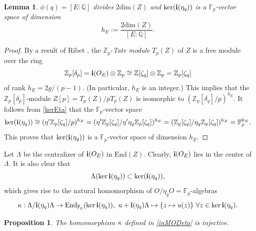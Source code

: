 \documentclass[12pt,a4paper,reqno]{amsart}
\def\Q{{\mathbb Q}}
\def\Z{{\mathbb Z}}
\def\F{{\mathbb F}}
\def\End{\mathrm{End}}
\def\dim{\mathrm{dim}}
\newtheorem{lem}[thm]{Lemma}
\newtheorem{prop}[thm]{Proposition}
\theoremstyle{definition}
\begin{document}
\begin{lem}
\label{RibetEta}
$\phi(q)=[E:\Q]$ divides $2\dim(Z)$ and $\ker({\bf i}(\eta_q))$ is a $\F_p$-vector space of dimension 
$$h_E:=\frac{2\dim(Z)}{[E:\Q]}.$$
\end{lem}

\begin{proof}
 By a result of Ribet \cite[Prop. 2.2.1 on p. 769]{Ribet2}, the
$\Z_p$-{\sl Tate module} $T_p(Z)$ of $Z$ is a free module over the ring
$$\Z_p[\delta_p]={\bf i}(O_E)\otimes \Z_p \cong \Z[\zeta_q]\otimes \Z_p =\Z_p[\zeta_q]$$
 of rank $h_E=2g/(p-1)$. (In particular, $h_E$ is an integer.) 
 This implies that the $\Z_p[\delta_p]$-module 
$Z[p]=T_p(Z)/p T_p(Z)$  is isomorphic to $(\Z_p[\delta_q]/p)^{h_E}$.  It follows from \eqref{kerEta} that the $\F_p$-vector space
$$\ker({\bf i}(\eta_q))\cong (\eta^{\prime}\Z_p[\zeta_q]/p)^{h_E}=(\eta^{\prime} \Z_p[\zeta_q]/ \eta^{\prime}\eta_q \Z_p[\zeta_q])^{h_E}=
 (\Z_p[\zeta_q]/\eta_q\Z_p[\zeta_q])^{h_E}=\F_p^{h_E}.$$
 This proves that $\ker({\bf i}(\eta_q))$ is a $\F_p$-vector space of dimension $h_E$.
\end{proof}

 Let $\Lambda$ be the centralizer of ${\bf i}(O_E)$ in $\End(Z)$.  Clearly, ${\bf i}(O_E)$ lies in the center of $\Lambda$.
 It is also clear that
 $$\Lambda (\ker {\bf i}(\eta_q)) \subset \ker({\bf i}(\eta_q)),$$
 which gives rise to the natural  homomorphism of $O/\eta_q O=\F_p$-algebras
 \begin{equation}
 \label{inMODeta}
 {\bf \kappa}: \Lambda/{\bf i}(\eta_q)\Lambda \to \End_{\F_p}(\ker {\bf i}(\eta_q)),  \ u+{\bf i}(\eta_q)\Lambda \mapsto \{z \mapsto u(z)\} \ \forall z \in \ker {\bf i}(\eta_q).
 \end{equation}
 
 \begin{prop}
 \label{inEta}
 The homomorphism ${\bf \kappa}$ defined in \eqref{inMODeta} is injective.
 \end{prop}
 
\end{document}

